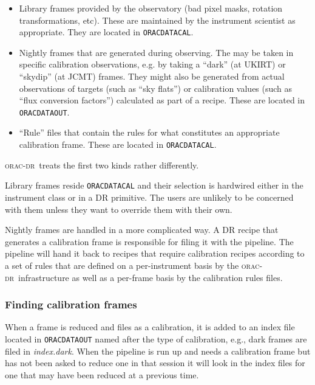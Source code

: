 \documentclass[twoside,11pt]{article}
\renewcommand{\_}{\texttt{\symbol{95}}}
\newcommand{\oracdr}{\textsc{orac-dr}}
\begin{document}
\begin{itemize}
\item 

Library frames provided by the observatory (bad pixel masks, rotation
transformations, etc). These are maintained by the instrument
scientist as appropriate. They are located in \texttt{ORAC\_DATA\_CAL}.

\item 

Nightly frames that are generated during observing. The may be taken
in specific calibration observations, e.g. by taking a ``dark'' (at UKIRT)
or ``skydip'' (at JCMT) frames. They might also be generated from
actual observations of targets (such as ``sky flats'') or
calibration values (such as ``flux conversion factors'') calculated
as part of a recipe. These are located in \texttt{ORAC\_DATA\_OUT}.

\item 

``Rule'' files that contain the rules for what constitutes an
appropriate calibration frame. These are located in \texttt{ORAC\_DATA\_CAL}.

\end{itemize}


\oracdr\ treats the first two kinds rather differently.



Library frames reside \texttt{ORAC\_DATA\_CAL} and their selection is hardwired
either in the instrument class or in a DR primitive. The users are
unlikely to be concerned with them unless they want to override them
with their own.



Nightly frames are handled in a more complicated way. A DR recipe that
generates a calibration frame is responsible for filing it with the
pipeline. The pipeline will hand it back to recipes that require
calibration recipes according to a set of rules that are defined
on a per-instrument basis by the \oracdr\ infrastructure as well
as a per-frame basis by the calibration rules files.

\subsubsection*{Finding calibration frames\label{The_ORAC-DR_Calibration_Selection_Finding_calibration_frames}}

When a frame is reduced and files as a calibration, it is added to an
index file located in \texttt{ORAC\_DATA\_OUT} named after the type of
calibration, e.g., dark frames are filed in \emph{index.dark}. When the
pipeline is run up and needs a calibration frame but has not been
asked to reduce one in that session it will look in the index files
for one that may have been reduced at a previous time.
\end{document}
